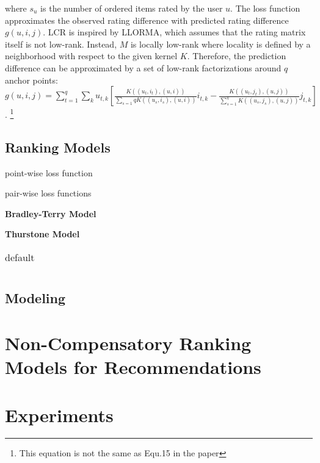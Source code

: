 \documentclass[letterpaper]{article} %
\begin{document}
where $s_u$ is the number of ordered items rated by the user $u$. The loss function approximates the observed rating difference with predicted rating difference $g(u,i,j)$. LCR is inspired by LLORMA, which assumes that the rating matrix itself is not low-rank. Instead, $M$ is locally low-rank where locality is defined by a neighborhood with respect to the given kernel $K$. Therefore, the prediction difference can be approximated by a set of low-rank factorizations around $q$ anchor points: $g(u,i,j)=\sum_{t=1}^{q} \sum_k u_{t, k} [\frac{K((u_t,i_t),(u,i))}{\sum_{s=1}{q} K((u_s,i_s),(u,i))} i_{t,k} - \frac{K((u_t,j_t),(u,j))}{\sum_{s=1}^{q} K((u_s,j_s),(u,j))} j_{t,k}] $.  \footnote{This equation is not the same as Equ.15 in the paper}



\subsection{Ranking Models}
point-wise loss function

pair-wise loss functions

\textbf{Bradley-Terry Model}

\textbf{Thurstone Model}

\begin{table}[htp]
\caption{default}
\begin{center}
\begin{tabular}{|c|c|c|c|}

\end{tabular}
\end{center}
\label{default}
\end{table}%

\subsection{Modeling }
\section{Non-Compensatory Ranking Models for Recommendations}

\section{Experiments}
\end{document}
